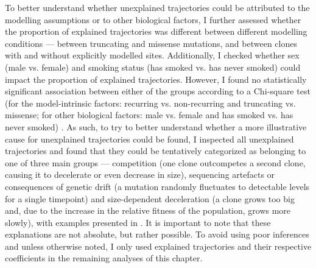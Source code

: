 \begin{figure}[!ht]
	\label{fig:ch-trajectories-explained-mut-tp}
\end{figure}

To better understand whether unexplained trajectories could be attributed to the modelling assumptions or to other biological factors, I further assessed whether the proportion of explained trajectories was different between different modelling conditions --- between truncating and missense mutations, and between clones with and without explicitly modelled sites. Additionally, I checked whether sex (male vs. female) and smoking status (has smoked vs. has never smoked) could impact the proportion of explained trajectories. However, I found no statistically significant association between either of the groups according to a Chi-square test (for the model-intrinsic factors: recurring vs. non-recurring and truncating vs. missense; for other biological factors: male vs. female and has smoked vs. has never smoked) . As such, to try to better understand whether a more illustrative cause for unexplained trajectories could be found, I inspected all unexplained trajectories and found that they could be tentatively categorized as belonging to one of three main groups --- competition (one clone outcompetes a second clone, causing it to decelerate or even decrease in size), sequencing artefacts or consequences of genetic drift (a mutation randomly fluctuates to detectable levels for a single timepoint) and size-dependent deceleration (a clone grows too big and, due to the increase in the relative fitness of the population, grows more slowly), with examples presented in . It is important to note that these explanations are not absolute, but rather possible. To avoid using poor inferences and unless otherwise noted, I only used explained trajectories and their respective coefficients in the remaining analyses of this chapter.

\begin{figure}[!ht]
    \label{gfx/dynamics-2/ch-unexplained-trunc-site-sex-smoke.pdf}
	\label{fig:ch-unexplained-trunc-site-sex-smoke}
\end{figure}

